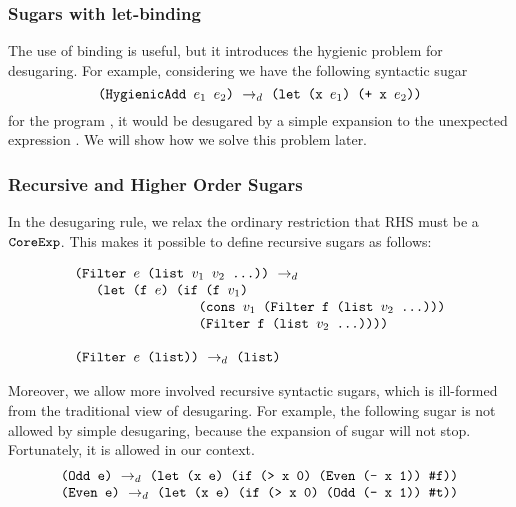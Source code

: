 \subsubsection{Sugars with let-binding}
\label{mark:let}
The use of  binding is useful, but it introduces the hygienic problem for desugaring. For example, considering we have the following syntactic sugar
\[
\texttt{(HygienicAdd $e_1$ $e_2$)} ~\rightarrow_d~ \texttt{(let (x $e_1$) (+ x $e_2$))}
\]
for the program , it would be desugared by a simple expansion to the unexpected expression . We will show how we solve this problem later.

\subsubsection{Recursive and Higher Order Sugars}
\label{mark:recsugar}
In the desugaring rule, we relax the ordinary restriction that RHS must be a $\mbox{\tt CoreExp}$. This makes it possible to define recursive sugars as follows:

\[\begin{array}{l}
	\texttt{(Filter $e$ (list $v_1$ $v_2$ ...))} ~\rightarrow_d~\\
	\quad
	\texttt{ (let (f $e$) (if (f $v_1$)}\\
	\qquad\qquad\qquad\qquad\ \texttt{ (cons $v_1$ (Filter f (list $v_2$ ...)))}\\
	\qquad\qquad\qquad\qquad\ \texttt{ (Filter f (list $v_2$ ...))))}\\
\\
	\texttt{(Filter $e$ (list))} ~\rightarrow_d~ \texttt{(list)}
	\end{array}
\]

Moreover, we allow more involved recursive syntactic sugars, which is ill-formed from the traditional view of desugaring. For example, the following sugar is not allowed by simple desugaring, because the expansion of sugar will not stop. Fortunately, it is allowed in our context.
\[
\begin{array}{l}
\texttt{(Odd e)} ~\rightarrow_d~ \texttt{(let (x~e)~(if~(>~x~0)~(Even~(-~x~1))~\mbox{\tt \#f}))}\\
\texttt{(Even e)} ~\rightarrow_d~ \texttt{(let (x~e)~(if~(>~x~0)~(Odd~(-~x~1))~\mbox{\tt \#t}))}
\end{array}
\]

